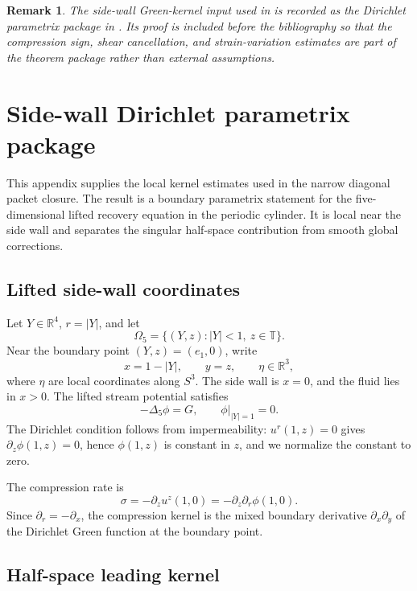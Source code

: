 \documentclass[11pt]{amsart}
\newtheorem{remark}[theorem]{Remark}
\begin{document}
\begin{remark}
The side-wall Green-kernel input used in  is recorded as the Dirichlet parametrix package in .  Its proof is included before the bibliography so that the compression sign, shear cancellation, and strain-variation estimates are part of the theorem package rather than external assumptions.
\end{remark}

\appendix
\section{Side-wall Dirichlet parametrix package}\label{app:sidewall_parametrix}

This appendix supplies the local kernel estimates used in the narrow diagonal packet closure.  The result is a boundary parametrix statement for the five-dimensional lifted recovery equation in the periodic cylinder.  It is local near the side wall and separates the singular half-space contribution from smooth global corrections.

\subsection{Lifted side-wall coordinates}

Let \(Y\in\mathbb R^4\), \(r=|Y|\), and let
\[
\Omega_5=\{(Y,z): |Y|<1,\ z\in\mathbb T\}.
\]
Near the boundary point \((Y,z)=(e_1,0)\), write
\[
x=1-|Y|,
\qquad
 y=z,
\qquad
\eta\in\mathbb R^3,
\]
where \(\eta\) are local coordinates along \(S^3\).  The side wall is \(x=0\), and the fluid lies in \(x>0\).  The lifted stream potential satisfies
\[
-\Delta_5\phi=G,
\qquad
\phi|_{|Y|=1}=0.
\]
The Dirichlet condition follows from impermeability: \(u^r(1,z)=0\) gives \(\partial_z\phi(1,z)=0\), hence \(\phi(1,z)\) is constant in \(z\), and we normalize the constant to zero.

The compression rate is
\[
\sigma=-\partial_z u^z(1,0)=-\partial_z\partial_r\phi(1,0).
\]
Since \(\partial_r=-\partial_x\), the compression kernel is the mixed boundary derivative \(\partial_x\partial_y\) of the Dirichlet Green function at the boundary point.

\subsection{Half-space leading kernel}
\end{document}
